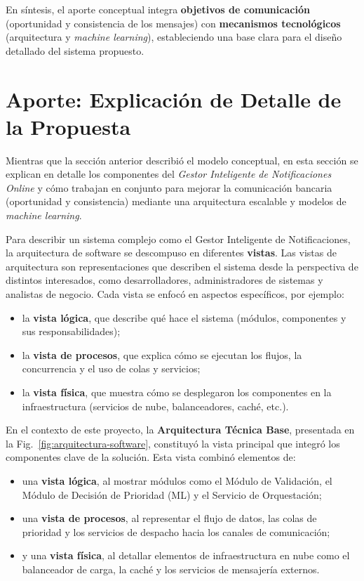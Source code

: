 \documentclass[conference]{IEEEtran}
\begin{document}
En s{\'i}ntesis, el aporte conceptual integra \textbf{objetivos de comunicaci{\'o}n} (oportunidad y consistencia de los mensajes) con \textbf{mecanismos tecnol{\'o}gicos} (arquitectura y \textit{machine learning}), estableciendo una base clara para el dise{\~n}o detallado del sistema propuesto.




\section{Aporte: Explicaci{\'o}n de Detalle de la Propuesta}

Mientras que la secci{\'o}n anterior describi{\'o} el modelo conceptual, en esta secci{\'o}n se explican en detalle los componentes del \textit{Gestor Inteligente de Notificaciones Online} y c{\'o}mo trabajan en conjunto para mejorar la comunicaci{\'o}n bancaria (oportunidad y consistencia) mediante una arquitectura escalable y modelos de \textit{machine learning}.

Para describir un sistema complejo como el Gestor Inteligente de Notificaciones, la arquitectura de software se descompuso en diferentes \textbf{vistas}. Las vistas de arquitectura son representaciones que describen el sistema desde la perspectiva de distintos interesados, como desarrolladores, administradores de sistemas y analistas de negocio. Cada vista se enfoc{\'o} en aspectos espec{\'i}ficos, por ejemplo:
\begin{itemize}
  \item la \textbf{vista l{\'o}gica}, que describe qu{\'e} hace el sistema (m{\'o}dulos, componentes y sus responsabilidades);
  \item la \textbf{vista de procesos}, que explica c{\'o}mo se ejecutan los flujos, la concurrencia y el uso de colas y servicios;
  \item la \textbf{vista f{\'i}sica}, que muestra c{\'o}mo se desplegaron los componentes en la infraestructura (servicios de nube, balanceadores, cach{\'e}, etc.).
\end{itemize}

En el contexto de este proyecto, la \textbf{Arquitectura T{\'e}cnica Base}, presentada en la Fig.~\ref{fig:arquitectura-software}, constituy{\'o} la vista principal que integr{\'o} los componentes clave de la soluci{\'o}n. Esta vista combin{\'o} elementos de:
\begin{itemize}
  \item una \textbf{vista l{\'o}gica}, al mostrar m{\'o}dulos como el M{\'o}dulo de Validaci{\'o}n, el M{\'o}dulo de Decisi{\'o}n de Prioridad (ML) y el Servicio de Orquestaci{\'o}n;
  \item una \textbf{vista de procesos}, al representar el flujo de datos, las colas de prioridad y los servicios de despacho hacia los canales de comunicaci{\'o}n;
  \item y una \textbf{vista f{\'i}sica}, al detallar elementos de infraestructura en nube como el balanceador de carga, la cach{\'e} y los servicios de mensajer{\'i}a externos.
\end{itemize}
\end{document}
